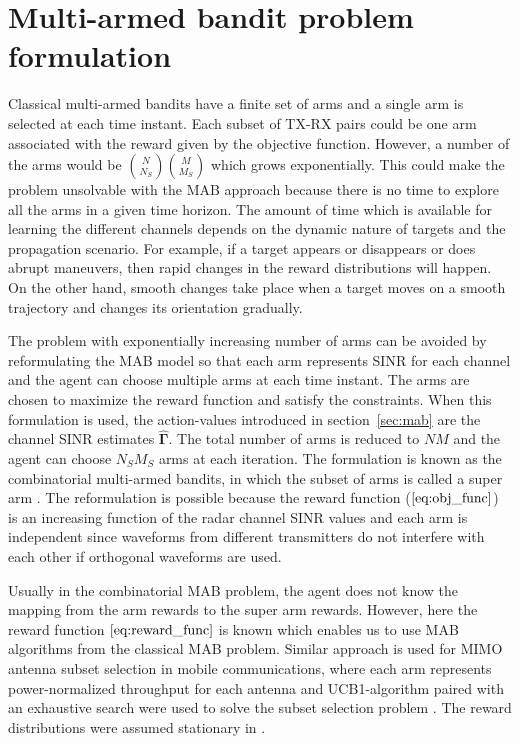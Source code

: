 \documentclass[conference]{IEEEtran}
\newcommand{\vsinrb}{\widehat{\boldsymbol{\Gamma}}}
\begin{document}
\section{Multi-armed bandit problem formulation}
\label{sec:fmab}

Classical multi-armed bandits have a finite set of arms and a single arm is selected at each time instant.
Each subset of TX-RX pairs could be one arm associated with the reward given by the objective function.
However, a number of the arms would be $\binom{N}{N_S}\binom{M}{M_S}$ which grows exponentially. This could make the problem unsolvable with the MAB approach because there is no time to explore all the arms in a given time horizon.
The amount of time which is available for learning the different channels depends on the dynamic nature of targets and the propagation scenario.
For example, if a target appears or disappears or does abrupt maneuvers, then rapid changes in the reward distributions will happen. 
On the other hand, smooth changes take place when a target moves on a smooth trajectory and changes its orientation gradually.

The problem with exponentially increasing number of arms can be avoided by reformulating the MAB model so that each arm represents SINR for each channel and the agent can choose multiple arms at each time instant.
The arms are chosen to maximize the reward function and satisfy the constraints.
When this formulation is used, the action-values introduced in section~\ref{sec:mab} are the channel SINR estimates $\vsinrb$.
The total number of arms is reduced to $NM$ and the agent can choose $N_S M_S$ arms at each iteration.
The formulation is known as the combinatorial multi-armed bandits, in which the subset of arms is called a super arm \cite{comb_mab}.
The reformulation is possible because the reward function ($\ref{eq:obj_func}$) is an increasing function of the radar channel SINR values and each arm is independent since waveforms from different transmitters do not interfere with each other if orthogonal waveforms are used.

Usually in the combinatorial MAB problem, the agent does not know the mapping from the arm rewards to the super arm rewards.
However, here the reward function $\eqref{eq:reward_func}$ is known which enables us to use MAB algorithms from the classical MAB problem.
Similar approach is used for MIMO antenna subset selection in mobile communications, where each arm represents power-normalized throughput for each antenna and UCB1-algorithm paired with an exhaustive search were used to solve the subset selection problem \cite{MAB_subset_selection}.
The reward distributions were assumed stationary in \cite{MAB_subset_selection}.  
\end{document}
